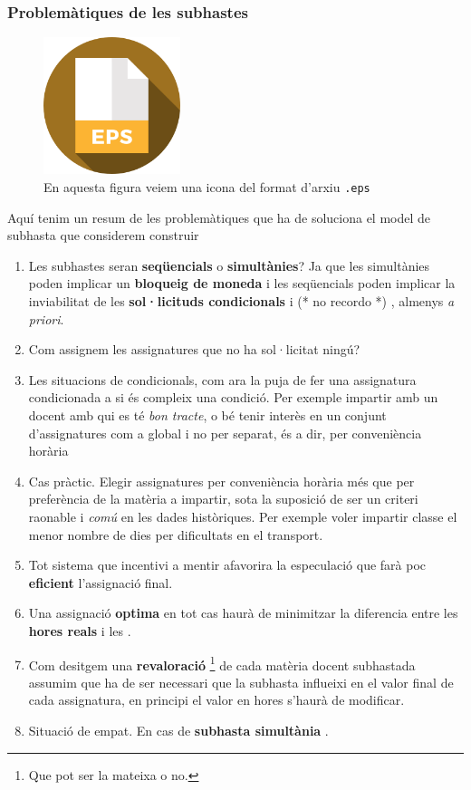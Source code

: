 \documentclass[10pt,twocolumn]{article}
\newcommand{\nehh}[1]{\color{magenta} (* {#1} *) \normalcolor }
\begin{document}
\subsubsection{Problemàtiques de les  subhastes}
\begin{figure}
	\includegraphics[width=4cm]{eps}
	\caption{En aquesta figura veiem una icona del format d'arxiu \texttt{.eps}}
	\label{fig:3}
\end{figure}
Aquí tenim un resum de les problemàtiques que ha de soluciona el model de subhasta que considerem construir 
\begin{tcolorbox}[colback=black!1,title=\textbf{Llista problemàtiques subhastes},coltitle=black,colbacktitle=black!10]
\begin{enumerate}
	\item Les subhastes seran \textbf{seqüencials} o \textbf{simultànies}? Ja que les simultànies  poden implicar un \textbf{bloqueig de moneda} i les seqüencials poden implicar la inviabilitat de les \textbf{sol·licituds condicionals} i \nehh{no recordo}, almenys \textit{ a priori}.
	\item Com assignem les assignatures que no ha sol·licitat ningú?
	\item Les situacions de condicionals, com ara la puja de fer una assignatura condicionada a si  és compleix una condició.{\color{gray} Per exemple impartir amb un docent amb qui es té  \textit{bon tracte}, o bé tenir interès en un conjunt d'assignatures com a global i no per separat, és a dir, per conveniència horària} 
	\item Cas pràctic. Elegir assignatures per conveniència horària més  que per preferència de la matèria a impartir, sota la suposició de ser un criteri raonable i \textit{comú} en les dades històriques. {\color{gray} Per exemple voler impartir classe el menor nombre de dies per dificultats en el transport.}  
	\item Tot sistema que incentivi a mentir afavorira la especulació que farà poc \textbf{eficient} l'assignació final.
	\item Una assignació \textbf{optima} en tot cas haurà de  minimitzar la diferencia entre les \textbf{hores reals} i les .
	\item Com desitgem una \textbf{revaloració} \footnote{Que pot ser la mateixa o no.} de cada matèria docent subhastada assumim que ha de ser necessari que la subhasta influeixi en el valor final de cada assignatura, en principi el valor en hores s'haurà de modificar.
	\item Situació de empat. {\color{gray} En cas de \textbf{subhasta simultània} .}
\end{enumerate}
\end{tcolorbox}
\end{document}
